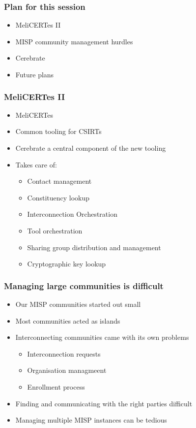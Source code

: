 
\begin{frame}[t,plain]
\titlepage
\end{frame}

\begin{frame}
\frametitle{Plan for this session}
    \begin{itemize}
        \item MeliCERTes II
        \item MISP community management hurdles
        \item Cerebrate
        \item Future plans
    \end{itemize}
\end{frame}

\begin{frame}
\frametitle{MeliCERTes II}
    \begin{itemize}
        \item MeliCERTes
        \item Common tooling for CSIRTs
        \item Cerebrate a central component of the new tooling
        \item Takes care of:
        \begin{itemize}
            \item Contact management
            \item Constituency lookup
            \item Interconnection Orchestration
            \item Tool orchestration
            \item Sharing group distribution and management
            \item Cryptographic key lookup
        \end{itemize}
    \end{itemize}
\end{frame}

\begin{frame}
\frametitle{Managing large communities is difficult}
    \begin{itemize}
        \item Our MISP communities started out small
        \item Most communities acted as islands
        \item Interconnecting communities came with its own problems
        \begin{itemize}
            \item Interconnection requests
            \item Organisation managmeent
            \item Enrollment process
        \end{itemize}
        \item Finding and communicating with the right parties difficult
        \item Managing multiple MISP instances can be tedious
    \end{itemize}
\end{frame}

